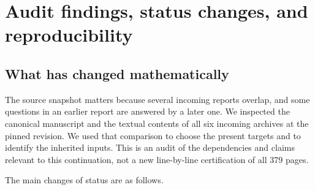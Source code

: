 \section{Audit findings, status changes, and reproducibility}
\label{sec:audit}

\subsection{What has changed mathematically}

The source snapshot matters because several incoming reports overlap,
and some questions in an earlier report are answered by a later one.
We inspected the canonical manuscript and the textual contents of all
six incoming archives at the pinned revision. We used that comparison
to choose the present targets and to identify the inherited inputs.
This is an audit of the dependencies and claims relevant to this
continuation, not a new line-by-line certification of all 379 pages.

The main changes of status are as follows.

